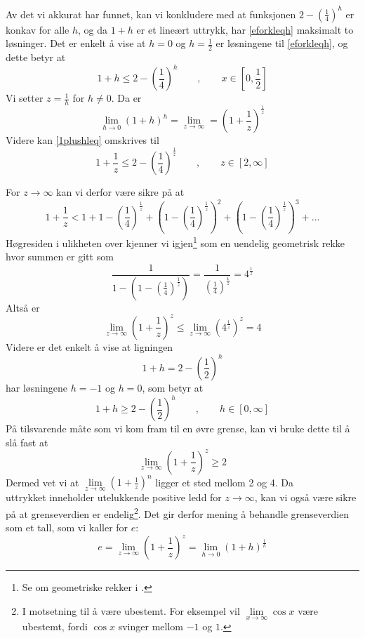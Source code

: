 \newpage
Av det vi akkurat har funnet, kan vi konkludere med at funksjonen $2-\left(\frac{1}{4}\right)^h $ er konkav for alle $ h $, og da $ 1+h$ er et lineært uttrykk, har \eqref{eforkleqh} maksimalt to løsninger. Det er enkelt å vise at $ h=0 $ og $ h=\frac{1}{2} $ er løsningene til \eqref{eforkleqh}, og dette betyr at
\begin{equation}\label{1plushleq}
1+h\leq 2-\left(\frac{1}{4}\right)^h\qquad,\qquad x\in\left[0, \frac{1}{2}\right] 	
\end{equation}
Vi setter $z=\frac{1}{h} $ for $ h\neq0 $. Da er
\[ \lim\limits_{h\to 0} (1+h)^h=\lim\limits_{z\to\infty}=\left(1+\frac{1}{z}\right)^\frac{1}{z} \]
Videre kan \eqref{1plushleq} omskrives til
\begin{equation}\label{eforkleqz}
	1+\frac{1}{z}\leq 2-\left(\frac{1}{4}\right)^\frac{1}{z}\qquad,\qquad z\in[2, \infty]
\end{equation}

For $ z\to\infty $ kan vi derfor være sikre på at
\[ 1+\frac{1}{z}<1+1-\left(\frac{1}{4}\right)^\frac{1}{z}+\left(1-\left(\frac{1}{4}\right)^\frac{1}{z}\right)^2+\left(1-\left(\frac{1}{4}\right)^\frac{1}{z}\right)^3+... \]
Høgresiden i ulikheten over kjenner vi igjen\footnote{Se om geometriske rekker i \tmto.} som en uendelig geometrisk rekke hvor summen er gitt som
\[ \frac{1}{1-\left(1-\left(\frac{1}{4}\right)^\frac{1}{z}\right)} =\frac{1}{\left(\frac{1}{4}\right)^\frac{1}{z}}=4^\frac{1}{z} \]
Altså er
\begin{equation}\label{eforkllim4}
	\lim\limits_{z\to\infty}\left(1+\frac{1}{z}\right)^z\leq \lim\limits_{z\to\infty}\left(4^\frac{1}{z}\right)^z=4
\end{equation}
\newpage
Videre er det enkelt å vise at ligningen
\[ 1+h=2-\left(\frac{1}{2}\right)^h \]
har løsningene $ h=-1 $ og $ h=0 $, som betyr at
\[ 1+h\geq2-\left(\frac{1}{2}\right)^h \qquad,\qquad h\in[0, \infty]\]
På tilsvarende måte som vi kom fram til en øvre grense, kan vi bruke dette til å slå fast at
\[ \lim\limits_{z\to \infty}\left(1 + \frac{1}{z}\right)^z\geq 2 \] 
Dermed vet vi at $ \lim\limits_{z\to\infty }\left(1+\frac{1}{z}\right)^n $ ligger et sted mellom 2 og 4. Da\\ uttrykket inneholder utelukkende positive ledd for $ {z\to\infty} $, kan vi også være sikre på at grenseverdien er endelig\footnote{I motsetning til å være ubestemt. For eksempel vil $ \lim\limits_{x\to \infty} \cos x $  være ubestemt, fordi $ \cos x $ svinger mellom $ -1 $ og $ 1 $.}. Det gir derfor mening å behandle grenseverdien som et tall, som vi kaller for $ e $:
\[ e=\lim\limits_{z\to\infty }\left(1+\frac{1}{z}\right)^z=\lim\limits_{h\to0}\left(1+h\right)^{\frac{1}{h}}  \]
